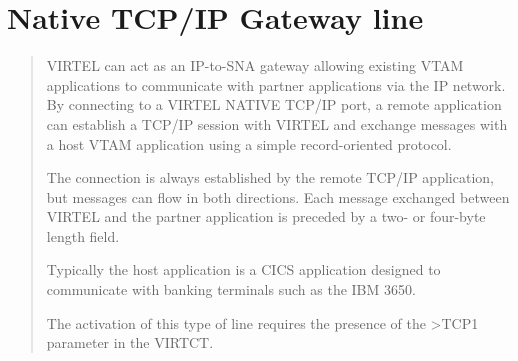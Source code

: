 \documentclass[letterpaper,10pt,english]{sphinxmanual}
\begin{document}
\section{Native TCP/IP Gateway line}
\label{\detokenize{connectivity_guide:native-tcp-ip-gateway-line}}\label{\detokenize{connectivity_guide:index-34}}\begin{quote}

VIRTEL can act as an IP-to-SNA gateway allowing existing VTAM applications to communicate with partner applications via the IP network. By connecting to a VIRTEL NATIVE TCP/IP port, a remote application can establish a TCP/IP session with VIRTEL and exchange messages with a host VTAM application using a simple record-oriented protocol.

The connection is always established by the remote TCP/IP application, but messages can flow in both directions. Each message  exchanged between VIRTEL and the partner application is preceded by a two- or four-byte length field.

Typically the host application is a CICS application designed to communicate with banking terminals such as the IBM 3650.

The activation of this type of line requires the presence of the \textgreater{}TCP1 parameter in the VIRTCT.
\end{quote}


\ignorespaces 
\end{document}
